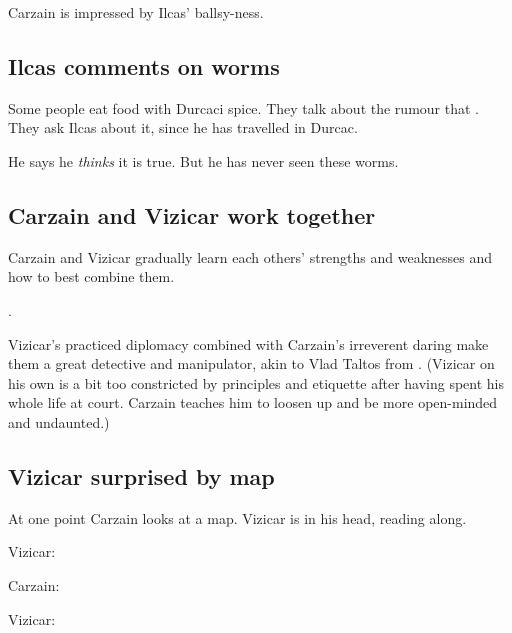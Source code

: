 \begin{garbage}
Carzain is impressed by Ilcas' ballsy-ness. 









\subsection{Ilcas comments on worms}
Some people eat food with Durcaci spice. 
They talk about the rumour that . 
They ask Ilcas about it, since he has travelled in Durcac. 

He says he \emph{thinks} it is true. 
But he has never seen these worms. 









\subsection{Carzain and Vizicar work together}
Carzain and Vizicar gradually learn each others' strengths and weaknesses and how to best combine them. 

. 

Vizicar's practiced diplomacy combined with Carzain's irreverent daring make them a great detective and manipulator, akin to Vlad Taltos from . 
(Vizicar on his own is a bit too constricted by principles and etiquette after having spent his whole life at court. Carzain teaches him to loosen up and be more open-minded and undaunted.)







\subsection{Vizicar surprised by map}
At one point Carzain looks at a map. 
Vizicar is in his head, reading along. 

\begin{prose}
  Vizicar: 
  
  Carzain: 
  
  Vizicar: 
  

\end{prose}
\end{garbage}
